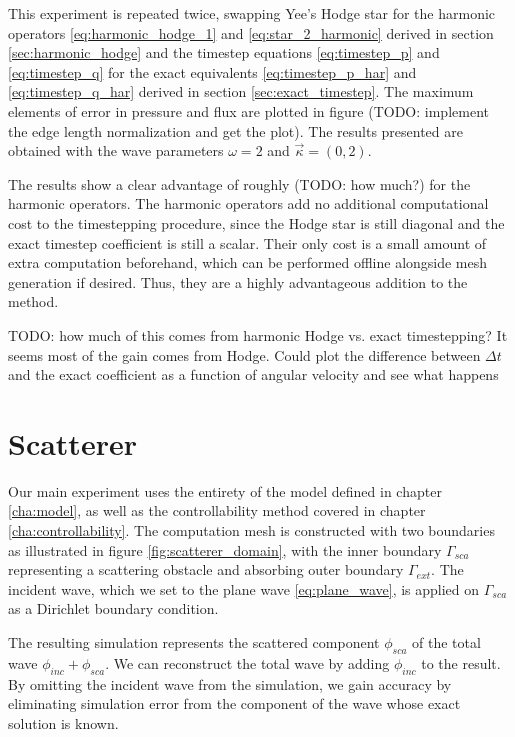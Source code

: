 \documentclass[utf8,english]{gradu3}
\begin{document}
This experiment is repeated twice, swapping Yee's Hodge star
for the harmonic operators \eqref{eq:harmonic_hodge_1} and \eqref{eq:star_2_harmonic}
derived in section \ref{sec:harmonic_hodge}
and the timestep equations \eqref{eq:timestep_p} and \eqref{eq:timestep_q}
for the exact equivalents \eqref{eq:timestep_p_har} and \eqref{eq:timestep_q_har}
derived in section \ref{sec:exact_timestep}.
The maximum elements of error in pressure and flux are plotted in figure
(TODO: implement the edge length normalization and get the plot).
The results presented are obtained with the wave parameters
$\omega = 2$ and $\vec{\kappa} = (0,2)$.

The results show a clear advantage of roughly (TODO: how much?)
for the harmonic operators.
The harmonic operators add no additional computational cost to the timestepping procedure,
since the Hodge star is still diagonal and the exact timestep coefficient is still a scalar.
Their only cost is a small amount of extra computation beforehand,
which can be performed offline alongside mesh generation if desired.
Thus, they are a highly advantageous addition to the method.

TODO: how much of this comes from harmonic Hodge vs. exact timestepping?
It seems most of the gain comes from Hodge.
Could plot the difference between $\Delta t$ and the exact coefficient
as a function of angular velocity and see what happens


\section{Scatterer}

Our main experiment uses the entirety of the model defined in chapter \ref{cha:model},
as well as the controllability method covered in chapter \ref{cha:controllability}.
The computation mesh is constructed with two boundaries
as illustrated in figure \ref{fig:scatterer_domain},
with the inner boundary $\Gamma_{sca}$ representing a scattering obstacle
and absorbing outer boundary $\Gamma_{ext}$.
The incident wave, which we set to the plane wave \eqref{eq:plane_wave},
is applied on $\Gamma_{sca}$ as a Dirichlet boundary condition.

The resulting simulation represents the scattered component $\phi_{sca}$
of the total wave $\phi_{inc} + \phi_{sca}$.
We can reconstruct the total wave by adding $\phi_{inc}$ to the result.
By omitting the incident wave from the simulation,
we gain accuracy by eliminating simulation error from the component of the wave
whose exact solution is known.
\end{document}
